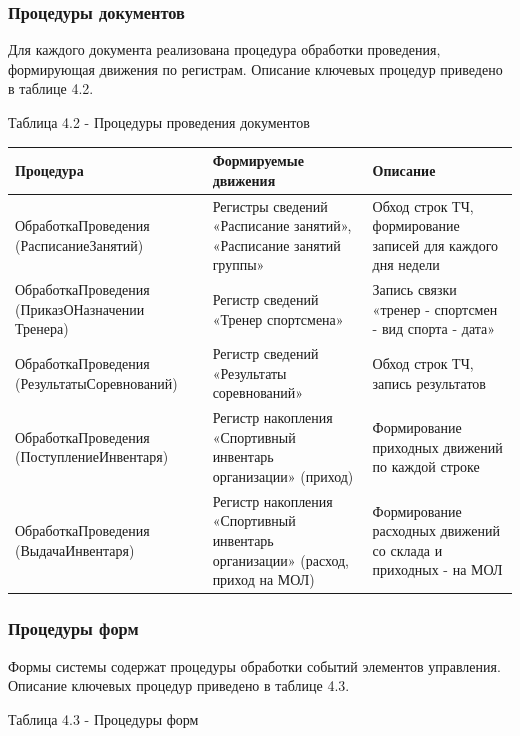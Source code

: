 \vspace{0.4cm}

\subsubsection{Процедуры документов}

Для каждого документа реализована процедура обработки проведения, формирующая движения по регистрам. Описание ключевых процедур приведено в таблице 4.2.


\vspace{0.2cm}

\newpage
\noindent
Таблица 4.2 - Процедуры проведения документов

\vspace{0.2cm}
\noindent
\begin{tabular}{|p{5.7cm}|p{5.25cm}|p{4.3cm}|}
	\hline
	Процедура & Формируемые движения & Описание \\
	\hline
	ОбработкаПроведения (РасписаниеЗанятий) & Регистры сведений «Расписание занятий», «Расписание занятий группы» & Обход строк ТЧ, формирование записей для каждого дня недели \\
	\hline
	ОбработкаПроведения (ПриказОНазначении Тренера) & Регистр сведений «Тренер спортсмена» & Запись связки «тренер - спортсмен - вид спорта - дата» \\
	\hline
	ОбработкаПроведения (РезультатыСоревнований) & Регистр сведений «Результаты соревнований» & Обход строк ТЧ, запись результатов \\
	\hline
	ОбработкаПроведения (ПоступлениеИнвентаря) & Регистр накопления «Спортивный инвентарь организации» (приход) & Формирование приходных движений по каждой строке \\
	\hline
	ОбработкаПроведения (ВыдачаИнвентаря) & Регистр накопления «Спортивный инвентарь организации» (расход, приход на МОЛ) & Формирование расходных движений со склада и приходных - на МОЛ \\
	\hline
\end{tabular}
\vspace{0.4cm}

\subsubsection{Процедуры форм}

Формы системы содержат процедуры обработки событий элементов управления. Описание ключевых процедур приведено в таблице 4.3.

\newpage
\noindent
Таблица 4.3 - Процедуры форм

